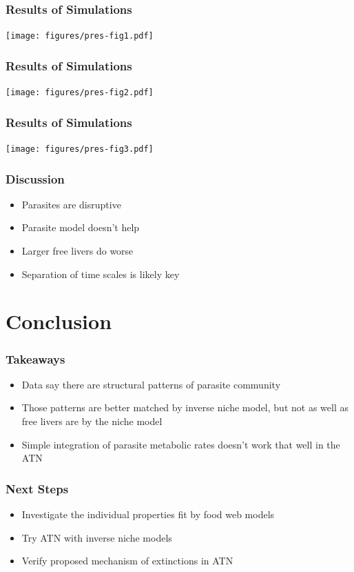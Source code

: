 \documentclass[table]{beamer}
\begin{document}
\begin{frame}
    \frametitle{Results of Simulations}
    \centering
    \texttt{[image: figures/pres-fig1.pdf]}
\end{frame}

\begin{frame}
    \frametitle{Results of Simulations}
    \centering
    \texttt{[image: figures/pres-fig2.pdf]}
\end{frame}

\begin{frame}
    \frametitle{Results of Simulations}
    \centering
    \texttt{[image: figures/pres-fig3.pdf]}
\end{frame}

\begin{frame}
    \frametitle{Discussion}
    \begin{itemize}[<+->]
        \item Parasites are disruptive
        \item Parasite model doesn't help
        \item Larger free livers do worse
        \item Separation of time scales is likely key
    \end{itemize}
\end{frame}

\section{Conclusion}

\begin{frame}
    \frametitle{Takeaways}
    \begin{itemize}[<+->]
        \item Data say there are structural patterns of parasite community 
        \item Those patterns are better matched by inverse niche model, but not as
            well as free livers are by the niche model
        \item Simple integration of parasite metabolic rates doesn't work that
            well in the ATN
    \end{itemize}
\end{frame}

\begin{frame}
    \frametitle{Next Steps}
    \begin{itemize}[<+->]
        \item Investigate the individual properties fit by food web models
        \item Try ATN with inverse niche models
        \item Verify proposed mechanism of extinctions in ATN
    \end{itemize}
\end{frame}



\end{document}
